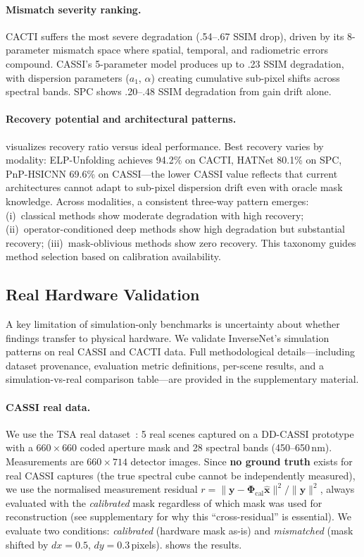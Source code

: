 \documentclass[runningheads]{llncs}
\begin{document}
\paragraph{Mismatch severity ranking.}
CACTI suffers the most severe degradation (.54--.67 SSIM drop), driven by its 8-parameter mismatch space where spatial, temporal, and radiometric errors compound.
CASSI's 5-parameter model produces up to .23 SSIM degradation, with dispersion parameters ($a_1$, $\alpha$) creating cumulative sub-pixel shifts across spectral bands.
SPC shows .20--.48 SSIM degradation from gain drift alone.

\paragraph{Recovery potential and architectural patterns.}
 visualizes recovery ratio versus ideal performance.
Best recovery varies by modality: ELP-Unfolding achieves 94.2\% on CACTI, HATNet 80.1\% on SPC, PnP-HSICNN 69.6\% on CASSI---the lower CASSI value reflects that current architectures cannot adapt to sub-pixel dispersion drift even with oracle mask knowledge.
Across modalities, a consistent three-way pattern emerges: (i)~classical methods show moderate degradation with high recovery; (ii)~operator-conditioned deep methods show high degradation but substantial recovery; (iii)~mask-oblivious methods show zero recovery.
This taxonomy guides method selection based on calibration availability.

\subsection{Real Hardware Validation}
\label{sec:real_data}

A key limitation of simulation-only benchmarks is uncertainty about whether findings transfer to physical hardware.
We validate InverseNet's simulation patterns on real CASSI and CACTI data.
Full methodological details---including dataset provenance, evaluation metric definitions, per-scene results, and a simulation-vs-real comparison table---are provided in the supplementary material.

\paragraph{CASSI real data.}
We use the TSA real dataset~\cite{choi2017kaist}: 5 real scenes captured on a DD-CASSI prototype with a $660 \times 660$ coded aperture mask and 28 spectral bands (450--650\,nm).
Measurements are $660 \times 714$ detector images.
Since \textbf{no ground truth} exists for real CASSI captures (the true spectral cube cannot be independently measured), we use the normalised measurement residual $r = \|\mathbf{y} - \mathbf{\Phi}_{\text{cal}}\hat{\mathbf{x}}\|^2 / \|\mathbf{y}\|^2$, always evaluated with the \emph{calibrated} mask regardless of which mask was used for reconstruction (see supplementary for why this ``cross-residual'' is essential).
We evaluate two conditions: \emph{calibrated} (hardware mask as-is) and \emph{mismatched} (mask shifted by $dx{=}0.5$, $dy{=}0.3$\,pixels).
 shows the results.
\end{document}
